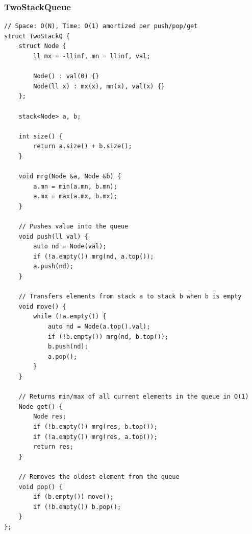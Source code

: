 \documentclass[9pt,a4paper,twocolumn]{extarticle}
\begin{document}
\subsubsection{TwoStackQueue}
\nopagebreak
\begin{lstlisting}
// Space: O(N), Time: O(1) amortized per push/pop/get
struct TwoStackQ {
    struct Node {
        ll mx = -llinf, mn = llinf, val;

        Node() : val(0) {}
        Node(ll x) : mx(x), mn(x), val(x) {}
    };

    stack<Node> a, b;

    int size() {
        return a.size() + b.size();
    }

    void mrg(Node &a, Node &b) {
        a.mn = min(a.mn, b.mn);
        a.mx = max(a.mx, b.mx);
    }

    // Pushes value into the queue
    void push(ll val) {
        auto nd = Node(val);
        if (!a.empty()) mrg(nd, a.top());
        a.push(nd);
    }

    // Transfers elements from stack a to stack b when b is empty
    void move() {
        while (!a.empty()) {
            auto nd = Node(a.top().val);
            if (!b.empty()) mrg(nd, b.top());
            b.push(nd);
            a.pop();
        }
    }

    // Returns min/max of all current elements in the queue in O(1)
    Node get() {
        Node res;
        if (!b.empty()) mrg(res, b.top());
        if (!a.empty()) mrg(res, a.top());
        return res;
    }

    // Removes the oldest element from the queue
    void pop() {
        if (b.empty()) move();
        if (!b.empty()) b.pop();
    }
};
\end{lstlisting}

\filbreak
\end{document}
